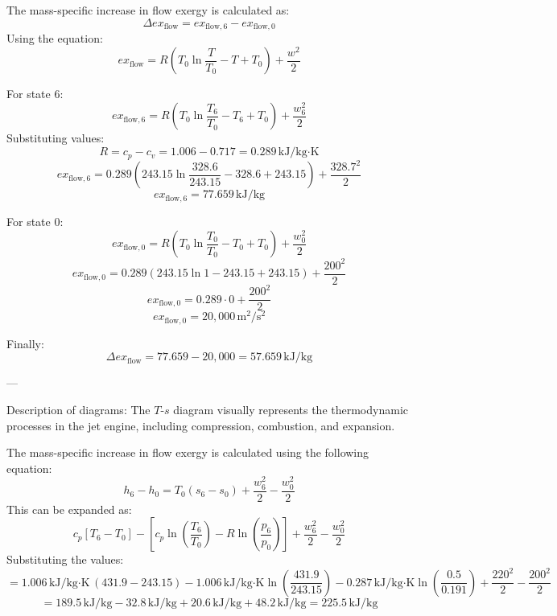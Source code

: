 The mass-specific increase in flow exergy is calculated as:  
\[
\Delta ex_{\text{flow}} = ex_{\text{flow},6} - ex_{\text{flow},0}
\]  
Using the equation:  
\[
ex_{\text{flow}} = R \left( T_0 \ln \frac{T}{T_0} - T + T_0 \right) + \frac{w^2}{2}
\]  

For state 6:  
\[
ex_{\text{flow},6} = R \left( T_0 \ln \frac{T_6}{T_0} - T_6 + T_0 \right) + \frac{w_6^2}{2}
\]  
Substituting values:  
\[
R = c_p - c_v = 1.006 - 0.717 = 0.289 \, \text{kJ/kg·K}
\]  
\[
ex_{\text{flow},6} = 0.289 \left( 243.15 \ln \frac{328.6}{243.15} - 328.6 + 243.15 \right) + \frac{328.7^2}{2}
\]  
\[
ex_{\text{flow},6} = 77.659 \, \text{kJ/kg}
\]  

For state 0:  
\[
ex_{\text{flow},0} = R \left( T_0 \ln \frac{T_0}{T_0} - T_0 + T_0 \right) + \frac{w_0^2}{2}
\]  
\[
ex_{\text{flow},0} = 0.289 \left( 243.15 \ln 1 - 243.15 + 243.15 \right) + \frac{200^2}{2}
\]  
\[
ex_{\text{flow},0} = 0.289 \cdot 0 + \frac{200^2}{2}
\]  
\[
ex_{\text{flow},0} = 20,000 \, \text{m}^2/\text{s}^2
\]  

Finally:  
\[
\Delta ex_{\text{flow}} = 77.659 - 20,000 = 57.659 \, \text{kJ/kg}
\]  

---

Description of diagrams:  
The \( T \)-\( s \) diagram visually represents the thermodynamic processes in the jet engine, including compression, combustion, and expansion.

The mass-specific increase in flow exergy is calculated using the following equation:  
\[
h_6 - h_0 = T_0 (s_6 - s_0) + \frac{w_6^2}{2} - \frac{w_0^2}{2}
\]  
This can be expanded as:  
\[
c_p [T_6 - T_0] - \left[ c_p \ln \left( \frac{T_6}{T_0} \right) - R \ln \left( \frac{p_6}{p_0} \right) \right] + \frac{w_6^2}{2} - \frac{w_0^2}{2}
\]  
Substituting the values:  
\[
= 1.006 \, \text{kJ/kg·K} \, (431.9 - 243.15) - 1.006 \, \text{kJ/kg·K} \ln \left( \frac{431.9}{243.15} \right) - 0.287 \, \text{kJ/kg·K} \ln \left( \frac{0.5}{0.191} \right) + \frac{220^2}{2} - \frac{200^2}{2}
\]  
\[
= 189.5 \, \text{kJ/kg} - 32.8 \, \text{kJ/kg} + 20.6 \, \text{kJ/kg} + 48.2 \, \text{kJ/kg} = 225.5 \, \text{kJ/kg}
\]